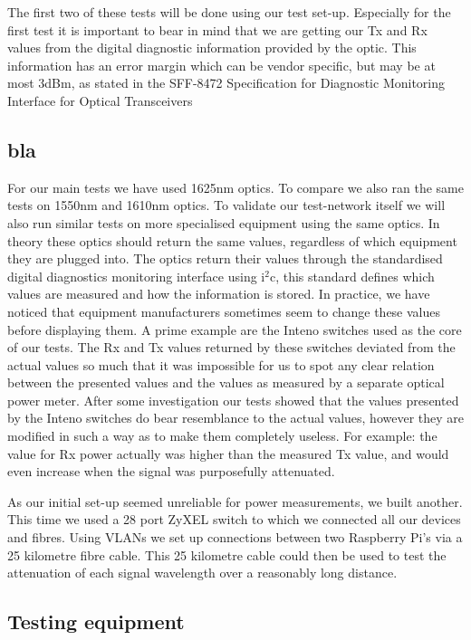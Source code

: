 \documentclass{article}
\begin{document}
The first two of these tests will be done using our test set-up.
Especially for the first test it is important to bear in mind that we are getting our Tx and Rx values from the digital diagnostic information provided by the optic.
This information has an error margin which can be vendor specific, but may be at most 3dBm, as stated in the SFF-8472 Specification for
Diagnostic Monitoring Interface for Optical Transceivers\cite{SFF:DDM}

\subsection{bla}
For our main tests we have used 1625nm optics.
To compare we also ran the same tests on 1550nm and 1610nm optics.
To validate our test-network itself we will also run similar tests on more specialised equipment using the same optics.
In theory these optics should return the same values, regardless of which equipment they are plugged into.
The optics return their values through the standardised digital diagnostics monitoring interface using i$^2$c, this standard defines which values are measured and how the information is stored.\cite{SFF:DDM}
In practice, we have noticed that equipment manufacturers sometimes seem to change these values before displaying them.
A prime example are the Inteno switches used as the core of our tests.
The Rx and Tx values returned by these switches deviated from the actual values so much that it was impossible for us to spot any clear relation between the presented values and the values as measured by a separate optical power meter.
After some investigation our tests showed that the values presented by the Inteno switches do bear resemblance to the actual values, however they are modified in such a way as to make them completely useless.
For example: the value for Rx power actually was higher than the measured Tx value, and would even increase when the signal was purposefully attenuated.

As our initial set-up seemed unreliable for power measurements, we built another.  This time we used a 28 port ZyXEL switch to which we connected all our devices and fibres.
Using VLANs we set up connections between two Raspberry Pi's via a 25 kilometre fibre cable.
This 25 kilometre cable could then be used to test the attenuation of each signal wavelength over a reasonably long distance.

\subsection{Testing equipment}
\end{document}
